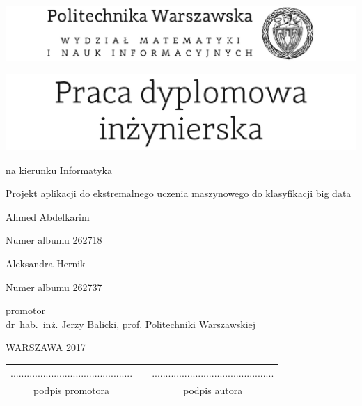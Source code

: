 \documentclass[12pt,twoside,a4paper]{article}
\def\discipline{Informatyka}
\def\title{Projekt aplikacji do ekstremalnego uczenia maszynowego do klasyfikacji big data}
\def\authori{Ahmed Abdelkarim}
\def\albumi{262718}
\def\authorii{Aleksandra Hernik}
\def\albumii{262737}
\def\supervisor{dr~hab.~inż. Jerzy Balicki, prof. Politechniki Warszawskiej}
\def\year{2017}
\begin{document}
\sloppy
\pagestyle{empty}


\includegraphics[scale=1.]{politechnika} 

\begin{center}
\vspace{40pt}

\includegraphics[scale=1.]{praca_inz} %

{ \arial na kierunku \discipline

\vspace{30pt}
{\arial \large \title}

\vspace{40pt}

{\arial \huge \authori }

\vspace{5pt}

Numer albumu \albumi

\vspace {20pt}
{\arial \huge \authorii}

\vspace{5pt}

Numer albumu \albumii

\vspace{40pt}

promotor \\
{\arial \supervisor}

\vspace{15pt}
 

 \vfill
WARSZAWA \year \\
}
\end{center}


\newpage
\null

\vfill

\begin{center}
\begin{tabular}[t]{ccc}
............................................. & \hspace*{100pt} & .............................................\\
podpis promotora & \hspace*{100pt} & podpis autora
\end{tabular}
\end{center}
\end{document}
